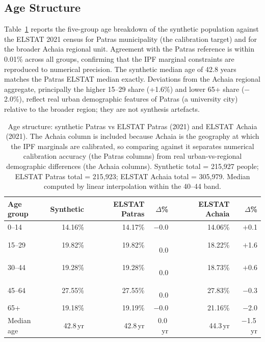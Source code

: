 \documentclass{article}
\begin{document}
\subsection{Age Structure}\label{age-structure}

Table~\ref{tab:age_structure} reports the five-group age breakdown of the synthetic population against the ELSTAT 2021 census for Patras municipality (the calibration target) and for the broader Achaia regional unit. Agreement with the Patras reference is within 0.01\% across all groups, confirming that the IPF marginal constraints are reproduced to numerical precision. The synthetic median age of 42.8 years matches the Patras ELSTAT median exactly. Deviations from the Achaia regional aggregate, principally the higher 15--29 share (+1.6\%) and lower 65+ share ($-$2.0\%), reflect real urban demographic features of Patras (a university city) relative to the broader region; they are not synthesis artefacts.

\begin{table}[htbp]
\centering
\caption{Age structure: synthetic Patras vs ELSTAT Patras (2021) and ELSTAT Achaia (2021). The Achaia column is included because Achaia is the geography at which the IPF marginals are calibrated, so comparing against it separates numerical calibration accuracy (the Patras columns) from real urban-vs-regional demographic differences (the Achaia columns). Synthetic total = 215,927 people; ELSTAT Patras total = 215,923; ELSTAT Achaia total = 305,979. Median computed by linear interpolation within the 40--44 band.}
\label{tab:age_structure}
\begin{tabular}{lrrrrr}
\toprule
Age group & Synthetic & ELSTAT Patras & $\Delta$\% & ELSTAT Achaia & $\Delta$\% \\
\midrule
0--14     & 14.16\%   & 14.17\%       & $-$0.0      & 14.06\%       & $+$0.1 \\
15--29    & 19.82\%   & 19.82\%       & $\phantom{-}$0.0 & 18.22\%  & $+$1.6 \\
30--44    & 19.28\%   & 19.28\%       & $\phantom{-}$0.0 & 18.73\%  & $+$0.6 \\
45--64    & 27.55\%   & 27.55\%       & $\phantom{-}$0.0 & 27.83\%  & $-$0.3 \\
65+       & 19.18\%   & 19.19\%       & $-$0.0      & 21.16\%       & $-$2.0 \\
\midrule
Median age & 42.8\,yr  & 42.8\,yr     & 0.0\,yr     & 44.3\,yr      & $-$1.5\,yr \\
\bottomrule
\end{tabular}
\end{table}
\end{document}
